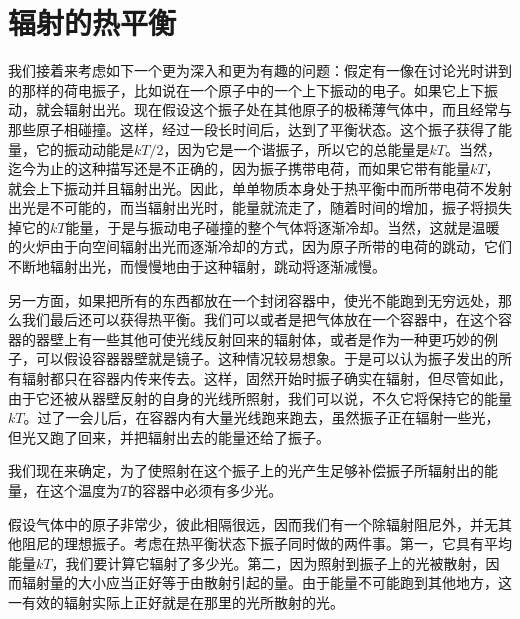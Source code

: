 \section{辐射的热平衡}

我们接着来考虑如下一个更为深入和更为有趣的问题：假定有一像在讨论光时讲到的那样的荷电振子，比如说在一个原子中的一个上下振动的电子。如果它上下振动，就会辐射出光。现在假设这个振子处在其他原子的极稀薄气体中，而且经常与那些原子相碰撞。这样，经过一段长时间后，达到了平衡状态。这个振子获得了能量，它的振动动能是$kT/2$，因为它是一个谐振子，所以它的总能量是$kT$。当然，迄今为止的这种描写还是不正确的，因为振子携带电荷，而如果它带有能量$kT$，就会上下振动并且辐射出光。因此，单单物质本身处于热平衡中而所带电荷不发射出光是不可能的，而当辐射出光时，能量就流走了，随着时间的增加，振子将损失掉它的$kT$能量，于是与振动电子碰撞的整个气体将逐渐冷却。当然，这就是温暖的火炉由于向空间辐射出光而逐渐冷却的方式，因为原子所带的电荷的跳动，它们不断地辐射出光，而慢慢地由于这种辐射，跳动将逐渐减慢。

另一方面，如果把所有的东西都放在一个封闭容器中，使光不能跑到无穷远处，那么我们最后还可以获得热平衡。我们可以或者是把气体放在一个容器中，在这个容器的器壁上有一些其他可使光线反射回来的辐射体，或者是作为一种更巧妙的例子，可以假设容器器壁就是镜子。这种情况较易想象。于是可以认为振子发出的所有辐射都只在容器内传来传去。这样，固然开始时振子确实在辐射，但尽管如此，由于它还被从器壁反射的自身的光线所照射，我们可以说，不久它将保持它的能量$kT$。过了一会儿后，在容器内有大量光线跑来跑去，虽然振子正在辐射一些光，但光又跑了回来，并把辐射出去的能量还给了振子。

我们现在来确定，为了使照射在这个振子上的光产生足够补偿振子所辐射出的能量，在这个温度为$T$的容器中必须有多少光。

假设气体中的原子非常少，彼此相隔很远，因而我们有一个除辐射阻尼外，并无其他阻尼的理想振子。考虑在热平衡状态下振子同时做的两件事。第一，它具有平均能量$kT$，我们要计算它辐射了多少光。第二，因为照射到振子上的光被散射，因而辐射量的大小应当正好等于由散射引起的量。由于能量不可能跑到其他地方，这一有效的辐射实际上正好就是在那里的光所散射的光。

